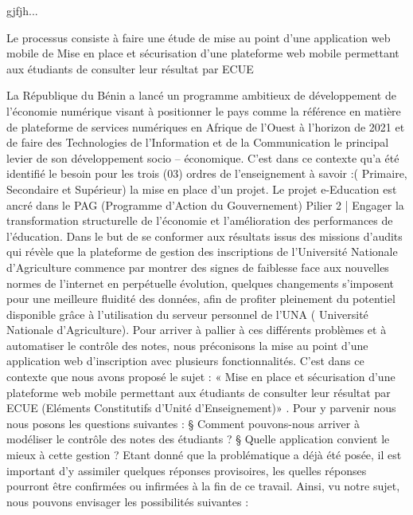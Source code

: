 gjfjh...

Le processus  consiste à faire une étude de mise au point d'une application web mobile de Mise en place et sécurisation d’une plateforme web mobile permettant aux étudiants de consulter leur résultat par ECUE  

La République du Bénin a lancé un programme ambitieux de développement de l’économie numérique visant à positionner le pays comme la référence en matière de plateforme de services numériques en Afrique de l’Ouest à l’horizon de 2021 et de faire des Technologies de l’Information et de la Communication le principal levier de son développement socio – économique.
C’est dans ce contexte qu’a été identifié le besoin pour les trois (03) ordres de l’enseignement à savoir :( Primaire, Secondaire et Supérieur) la mise en place d’un projet. Le projet e-Education est ancré dans le PAG (Programme d’Action du Gouvernement)  Pilier 2 | Engager la transformation structurelle de l’économie  et l’amélioration des performances de l’éducation.
Dans le but de se conformer aux résultats issus des missions d’audits qui révèle que la plateforme de gestion des inscriptions de l’Université Nationale d’Agriculture commence par montrer des signes de faiblesse face aux nouvelles normes de l’internet en perpétuelle évolution, quelques changements s’imposent  pour  une meilleure fluidité des données, afin de profiter pleinement du potentiel disponible grâce à l'utilisation du serveur personnel de l'UNA ( Université Nationale d’Agriculture).
Pour arriver à pallier à ces différents problèmes et à automatiser le contrôle des notes, nous préconisons la mise au point d'une application web d’inscription avec plusieurs fonctionnalités. C’est dans ce contexte que nous avons proposé  le sujet : « Mise en place et sécurisation d’une plateforme web mobile permettant aux étudiants de consulter leur résultat par ECUE (Eléments Constitutifs d’Unité d’Enseignement)» 
. Pour y parvenir nous nous posons les questions suivantes :
§ Comment pouvons-nous arriver à modéliser le contrôle des notes des étudiants ?
§ Quelle application convient le mieux à cette gestion ?	
Etant donné que la problématique a déjà été posée, il est important d'y assimiler quelques réponses provisoires, les quelles réponses pourront être confirmées ou infirmées à la fin de ce travail.
Ainsi, vu notre sujet, nous pouvons envisager les possibilités suivantes :
